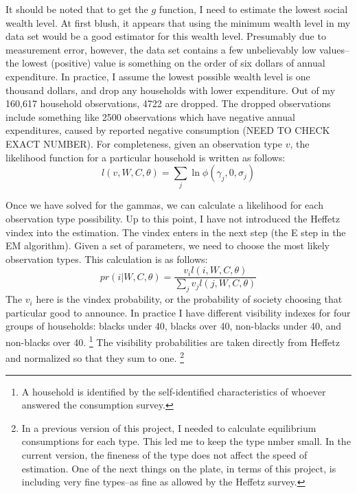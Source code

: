 \documentclass{article}
\begin{document}
It should be noted that to get the $g$ function, I need to estimate the lowest social wealth level. 
At first blush, it appears that using the minimum wealth level in my data set would be a good estimator for this wealth level.
Presumably due to measurement error, however, the data set contains a few unbelievably low values--the lowest (positive) value is something on the order of six dollars of annual expenditure.
In practice, I assume the lowest possible wealth level is one thousand dollars, and drop any households with lower expenditure.
Out of my 160,617 household observations, 4722 are dropped.
The dropped observations include something like 2500 observations which have negative annual expenditures, caused by reported negative consumption (NEED TO CHECK EXACT NUMBER).
For completeness, given an observation type $v$, the likelihood function for a particular household is written as follows:
\begin{equation}
	\label{lik1}
	l(v,W,C,\theta) = \sum_{j} \ln \phi(\gamma_j,0,\sigma_j)
\end{equation}

Once we have solved for the gammas, we can calculate a likelihood for each observation type possibility.
Up to this point, I have not introduced the Heffetz vindex into the estimation. The vindex enters in the next step (the E step in the EM algorithm).
Given a set of parameters, we need to choose the most likely observation types.
This calculation is as follows:
\begin{equation}
	pr(i|W,C,\theta) = \frac{v_i l(i,W,C,\theta)}{\sum_j v_j l(j,W,C,\theta)}
\end{equation}
The $v_i$ here is the vindex probability, or the probability of society choosing that particular good to announce.
In practice I have different visibility indexes for four groups of households: blacks under 40, blacks over 40, non-blacks under 40, and non-blacks over 40.
\footnote{A household is identified by the self-identified characteristics of whoever answered the consumption survey.} 
The visibility probabilities are taken directly from Heffetz and normalized so that they sum to one.
\footnote{In a previous version of this project, I needed to calculate equilibrium consumptions for each type.  This led me to keep the type nmber small.  In the current version, the fineness of the type does not affect the speed of estimation.  One of the next things on the plate, in terms of this project, is including very fine types--as fine as allowed by the Heffetz survey.}
\end{document}
